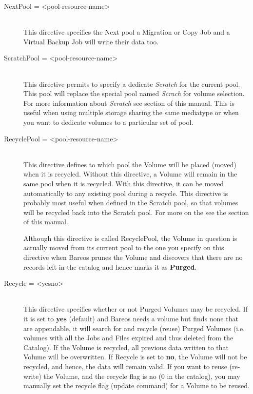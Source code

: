 \begin{description}
\item [NextPool = {\textless}pool-resource-name{\textgreater}] \hfill \\
This directive specifies the Next pool a Migration or Copy Job
and a Virtual Backup Job will write their data too.

\label{PoolScratchPool}
\item [ScratchPool = {\textless}pool-resource-name{\textgreater}] \hfill \\
This directive permits to specify a dedicate \textsl{Scratch} for the
current pool. This pool will replace the special pool named \textsl{Scrach}
for volume selection. For more information about \textsl{Scratch} see
 section of this manual. This is useful
when using multiple storage sharing the same mediatype or when you want to
dedicate volumes to a particular set of pool.

\label{PoolRecyclePool}
\item [RecyclePool = {\textless}pool-resource-name{\textgreater}] \hfill \\
This directive defines to which pool
the Volume will be placed (moved) when it is recycled. Without
this directive, a Volume will remain in the same pool when it is
recycled. With this directive, it can be moved automatically to any
existing pool during a recycle. This directive is probably most
useful when defined in the Scratch pool, so that volumes will
be recycled back into the Scratch pool. For more on the see the
 section of this manual.

Although this directive is called RecyclePool, the Volume in
question is actually moved from its current pool to the one
you specify on this directive when Bareos prunes the Volume and
discovers that there are no records left in the catalog and hence
marks it as {\bf Purged}.

\label{PoolRecycle}
\item [Recycle = {\textless}yes{\textbar}no{\textgreater}] \hfill \\
This directive specifies whether or not Purged Volumes may be recycled.
If it is set to {\bf yes} (default) and Bareos needs a volume but finds
none that are appendable, it will search for and recycle (reuse) Purged
Volumes (i.e.  volumes with all the Jobs and Files expired and thus
deleted from the Catalog).  If the Volume is recycled, all previous data
written to that Volume will be overwritten. If Recycle is set to {\bf
no}, the Volume will not be recycled, and hence, the data will remain
valid.  If you want to reuse (re-write) the Volume, and the recycle flag
is no (0 in the catalog), you may manually set the recycle flag (update
command) for a Volume to be reused.


\end{description}
